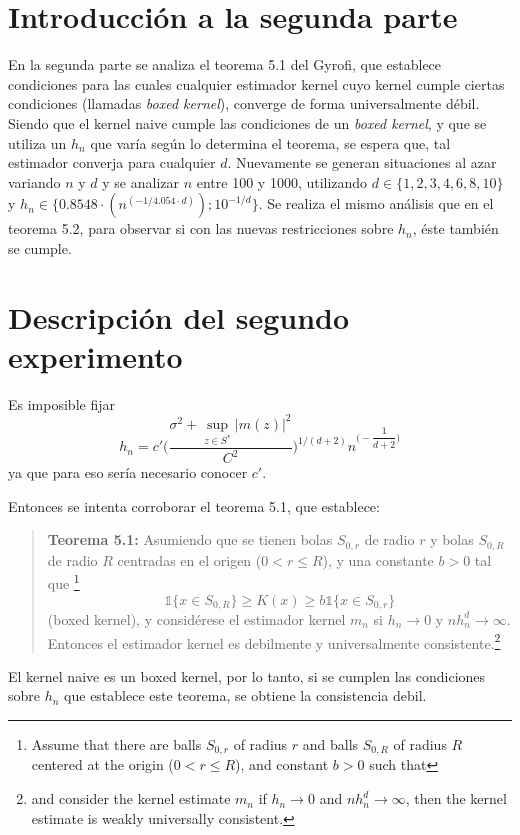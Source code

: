 \documentclass[12pt, a4paper]{article}
\begin{document}
\section{Introducción a la segunda parte}
En la segunda parte se analiza el teorema 5.1 del Gyrofi, que establece condiciones para las cuales cualquier estimador kernel cuyo kernel cumple ciertas condiciones (llamadas \textit{boxed kernel}), converge de forma universalmente débil. Siendo que el kernel naive cumple las condiciones de un \textit{boxed kernel}, y que se utiliza un $h_n$ que varía según lo determina el teorema, se espera que, tal estimador converja para cualquier $d$. Nuevamente se generan situaciones al azar variando $n$ y $d$ y se analizar $n$ entre 100 y 1000, utilizando $d\in\{ 1,2,3,4,6,8,10  \}$ y $h_n\in\{ 0.8548\cdot(n^(-1/4.054 \cdot d)); 10^{-1/d} \}$. Se realiza el mismo análisis que en el teorema 5.2, para observar si con las nuevas restricciones sobre $h_n$, éste también se cumple.

\section{Descripción del segundo experimento}

Es imposible fijar 
$$
h_n = c' \Bigg( \dfrac{\sigma^2 + \mathop{sup}_{z\in S^{*}}|m(z)|^2 }{C^2} \Bigg)^{1/(d+2)} n^{\Big (-\dfrac{1}{d+2}\Big )}
$$
ya que para eso sería necesario conocer $c'$.

Entonces se intenta corroborar el teorema 5.1, que establece:

\begin{quotation}
\textbf{Teorema 5.1:} Asumiendo que se tienen bolas $S_{0,r}$ de radio $r$ y bolas $S_{0,R}$ de radio $R$ centradas en el origen ($0 < r\leq R$), y una constante $b>0$ tal que \footnote{ Assume that there are balls $S_{0,r}$ of radius $r$ and balls $S_{0,R}$ of radius $R$ centered at the origin ($0 < r\leq R$), and constant $b>0$ such that }
$$
\mathds{1}\{x\in S_{0,R}\}\geq K(x) \geq b \mathds{1}\{x\in S_{0,r}\}
$$
(boxed kernel), y considérese el estimador kernel $m_n$ si $h_n \rightarrow 0$ y $n h_n^d \rightarrow \infty$. Entonces el estimador kernel es debilmente y universalmente consistente.\footnote{and consider the kernel estimate $m_n$ if $h_n \rightarrow 0$ and $n h_n^d \rightarrow \infty$, then the kernel estimate is weakly universally consistent.}
\end{quotation}

El kernel naive es un boxed kernel, por lo tanto, si se cumplen las condiciones sobre $h_n$ que establece este teorema, se obtiene la consistencia debil.
\end{document}
